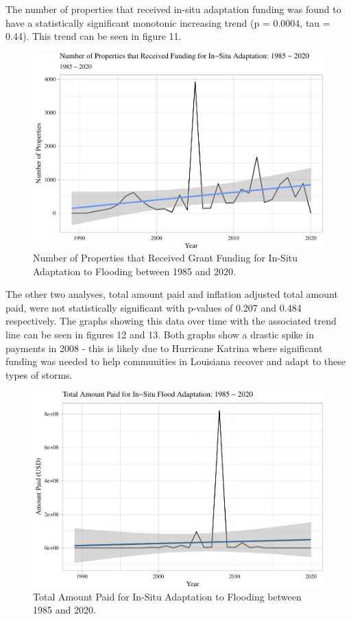 \documentclass[
  12pt,
]{article}
\begin{document}
The number of properties that received in-situ adaptation funding was
found to have a statistically significant monotonic increasing trend (p
= 0.0004, tau = 0.44). This trend can be seen in figure 11.

\begin{figure}
\centering
\includegraphics{finalreport_files/figure-latex/unnamed-chunk-22-1.pdf}
\caption{Number of Properties that Received Grant Funding for In-Situ
Adaptation to Flooding between 1985 and 2020.}
\end{figure}

\newpage

The other two analyses, total amount paid and inflation adjusted total
amount paid, were not statistically significant with p-values of 0.207
and 0.484 respectively. The graphs showing this data over time with the
associated trend line can be seen in figures 12 and 13. Both graphs show
a drastic spike in payments in 2008 - this is likely due to Hurricane
Katrina where significant funding was needed to help communities in
Louisiana recover and adapt to these types of storms.

\begin{figure}
\centering
\includegraphics{finalreport_files/figure-latex/unnamed-chunk-23-1.pdf}
\caption{Total Amount Paid for In-Situ Adaptation to Flooding between
1985 and 2020.}
\end{figure}
\end{document}
